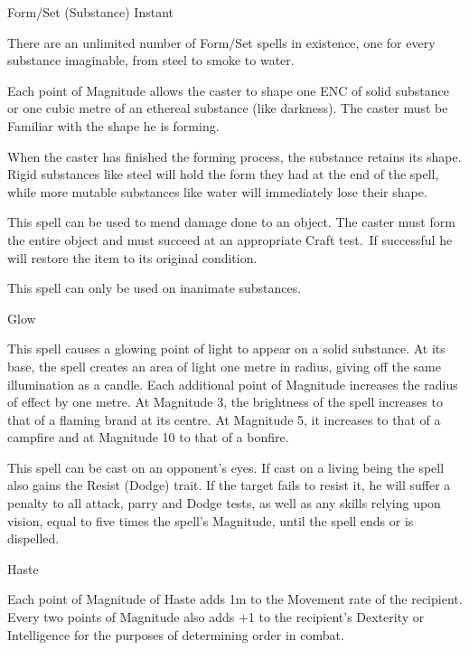 \begin{samepage}
\begin{rpg-spell}
{Form/Set (Substance)}
{Instant}

There are an unlimited number of Form/Set spells in existence, one for every substance imaginable, from steel to smoke to water. 

Each point of Magnitude allows the caster to shape one ENC of solid substance or one cubic metre of an ethereal substance (like darkness). The caster must be Familiar with the shape he is forming. 

When the caster has finished the forming process, the substance retains its shape. Rigid substances like steel will hold the form they had at the end of the spell, while more mutable substances like water will immediately lose their shape. 

This spell can be used to mend damage done to an object. The caster must form the entire object and must succeed at an appropriate Craft test. If successful he will restore the item to its original condition. 

This spell can only be used on inanimate substances. 
\end{rpg-spell}
\end{samepage}


\begin{samepage}
\begin{rpg-spell}
{Glow}
{}

This spell causes a glowing point of light to appear on a solid substance. At its base, the spell creates an area of light one metre in radius, giving off the same illumination as a candle. Each additional point of Magnitude increases the radius of effect by one metre. At Magnitude 3, the brightness of the spell increases to that of a flaming brand at its centre. At Magnitude 5, it increases to that of a campfire and at Magnitude 10 to that of a bonfire. 

This spell can be cast on an opponent’s eyes. If cast on a living being the spell also gains the Resist (Dodge) trait. If the target fails to resist it, he will suffer a penalty to all attack, parry and Dodge tests, as well as any skills relying upon vision, equal to five times the spell’s Magnitude, until the spell ends or is dispelled. 
\end{rpg-spell}
\end{samepage}


\begin{samepage}
\begin{rpg-spell}
{Haste}
{}

Each point of Magnitude of Haste adds 1m to the Movement rate of the recipient. Every two points of Magnitude also adds +1 to the recipient’s Dexterity or Intelligence for the purposes of determining order in combat. 
\end{rpg-spell}
\end{samepage}


